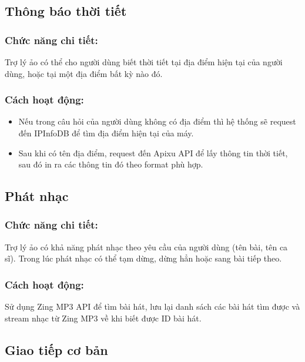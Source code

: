 \subsection{Thông báo thời tiết}

\subsubsection{Chức năng chi tiết:}

Trợ lý ảo có thể cho người dùng biết thời tiết tại địa điểm hiện tại của người dùng, hoặc tại một địa điểm bất kỳ nào đó.

\subsubsection{Cách hoạt động:}

\begin{itemize}
    \item Nếu trong câu hỏi của người dùng không có địa điểm thì hệ thống sẽ request đến IPInfoDB để tìm địa điểm hiện tại của máy.
    \item Sau khi có tên địa điểm, request đến Apixu API để lấy thông tin thời tiết, sau đó in ra các thông tin đó theo format phù hợp.
\end{itemize}

\subsection{Phát nhạc}

\subsubsection{Chức năng chi tiết:}

Trợ lý ảo có khả năng phát nhạc theo yêu cầu của người dùng (tên bài, tên ca sĩ). Trong lúc phát nhạc có thể tạm dừng, dừng hẳn hoặc sang bài tiếp theo.

\subsubsection{Cách hoạt động:}

Sử dụng Zing MP3 API để tìm bài hát, lưu lại danh sách các bài hát tìm được và stream nhạc từ Zing MP3 về khi biết được ID bài hát.

\subsection{Giao tiếp cơ bản}

